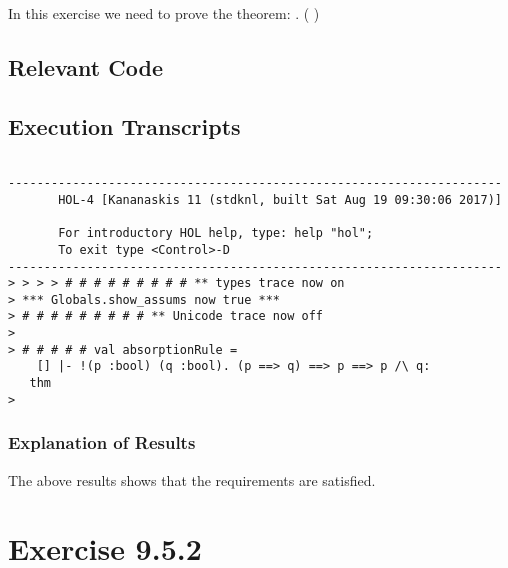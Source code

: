 \documentclass{report}
\begin{document}
In this exercise we need to prove the theorem:
\HOLTokenTurnstile{} \HOLSymConst{\HOLTokenForall{}} . ( \HOLSymConst{\HOLTokenImp{}} ) \HOLSymConst{\HOLTokenImp{}}  \HOLSymConst{\HOLTokenImp{}}  \HOLSymConst{\HOLTokenConj{}} 

\section{Relevant Code}
\label{sec:relevant-code-1}


\section{Execution Transcripts}
\label{sec:exec-transcr-1}

\setcounter{sessioncount}{0}
\begin{session}
  \begin{scriptsize}
\begin{verbatim}

---------------------------------------------------------------------
       HOL-4 [Kananaskis 11 (stdknl, built Sat Aug 19 09:30:06 2017)]

       For introductory HOL help, type: help "hol";
       To exit type <Control>-D
---------------------------------------------------------------------
> > > > # # # # # # # # # ** types trace now on
> *** Globals.show_assums now true ***
> # # # # # # # # # ** Unicode trace now off
> 
> # # # # # val absorptionRule =
    [] |- !(p :bool) (q :bool). (p ==> q) ==> p ==> p /\ q:
   thm
>  
\end{verbatim}
  \end{scriptsize}
\end{session}

\subsection{Explanation of Results}
\label{sec:explanation-results-1}
The above results shows that the requirements are satisfied.


 \chapter{Exercise 9.5.2}
 \label{cha:exercise-9.5.2}
  
\end{document}

